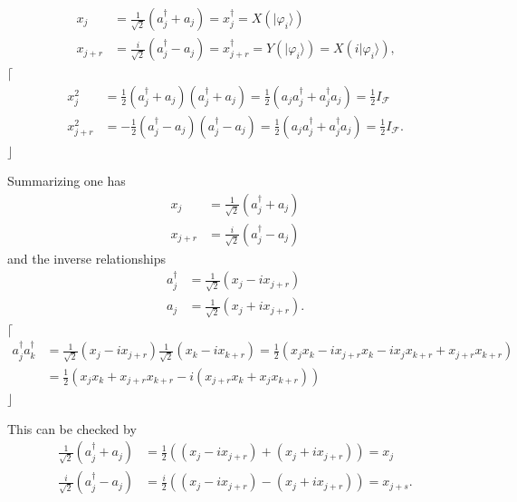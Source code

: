 \documentclass[aps, preprint]{revtex4}
\begin{document}
\begin{align}x_{j} &  =\frac{1}{\sqrt{2}} \left (a_{j}^{ \dag } +a_{j}\right ) =x_{j}^{ \dag } =X \left (\vert \varphi _{i} \rangle \right ) \\
x_{j +r} &  =\frac{i}{\sqrt{2}} \left (a_{j}^{ \dag } -a_{j}\right ) =x_{j +r}^{ \dag } =Y \left (\vert \varphi _{i} \rangle \right ) =X \left (i\vert \varphi _{i} \rangle \right )\text{,}\end{align}$\lceil $
\begin{align}x_{j}^{2} &  =\frac{1}{2} \left (a_{j}^{ \dag } +a_{j}\right ) \left (a_{j}^{ \dag } +a_{j}\right ) =\frac{1}{2} \left (a_{j} a_{j}^{ \dag } +a_{j}^{ \dag } a_{j}\right ) =\frac{1}{2} I_{\mathcal{F}} \\
x_{j +r}^{2} &  = -\frac{1}{2} \left (a_{j}^{ \dag } -a_{j}\right ) \left (a_{j}^{ \dag } -a_{j}\right ) =\frac{1}{2} \left (a_{j} a_{j}^{ \dag } +a_{j}^{ \dag } a_{j}\right ) =\frac{1}{2} I_{\mathcal{F}}\text{.}\end{align}$\rfloor $ 

Summarizing one has
\begin{align}x_{j} &  =\frac{1}{\sqrt{2}} \left (a_{j}^{ \dag } +a_{j}\right ) \\
x_{j +r} &  =\frac{i}{\sqrt{2}} \left (a_{j}^{ \dag } -a_{j}\right )\end{align}and the inverse relationships
\begin{align}a_{j}^{ \dag } &  =\frac{1}{\sqrt{2}} \left (x_{j} -i x_{j +r}\right ) \\
a_{j} &  =\frac{1}{\sqrt{2}} \left (x_{j} +i x_{j +r}\right )\text{.}\end{align}$\lceil $
\begin{align}a_{j}^{ \dag } a_{k}^{ \dag } &  =\frac{1}{\sqrt{2}} \left (x_{j} -i x_{j +r}\right ) \frac{1}{\sqrt{2}} \left (x_{k} -i x_{k +r}\right ) =\frac{1}{2} \left (x_{j} x_{k} -i x_{j +r} x_{k} -i x_{j} x_{k +r} +x_{j +r} x_{k +r}\right ) \\
 &  =\frac{1}{2} \left (x_{j} x_{k} +x_{j +r} x_{k +r} -i \left (x_{j +r} x_{k} +x_{j} x_{k +r}\right )\right )\end{align}$\rfloor $ 

This can be checked by
\begin{align}\frac{1}{\sqrt{2}} \left (a_{j}^{ \dag } +a_{j}\right ) &  =\frac{1}{2} \left (\left (x_{j} -i x_{j +r}\right ) +\left (x_{j} +i x_{j +r}\right )\right ) =x_{j} \nonumber  \\
\frac{i}{\sqrt{2}} \left (a_{j}^{ \dag } -a_{j}\right ) &  =\frac{i}{2} \left (\left (x_{j} -i x_{j +r}\right ) -\left (x_{j} +i x_{j +r}\right )\right ) =x_{j +s}\text{.}\end{align}
\end{document}
